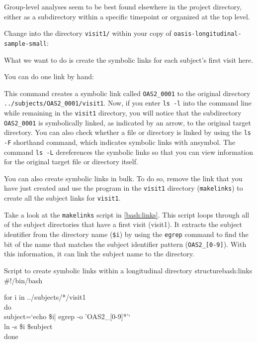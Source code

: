 Group-level analyses seem to be best found elsewhere in the project
directory, either as a subdirectory within a specific timepoint or organized at the top
level.

Change into the directory \texttt{visit1/} within your copy of \texttt{oasis-longitudinal-sample-small}:

What we want to do is create the symbolic links for each subject's first visit here. 

You can do one link by hand:

This command creates a symbolic link called \texttt{OAS2_0001} to the original directory \texttt{../subjects/OAS2_0001/visit1}. 
Now, if you enter \texttt{ls -l} into the command line while remaining in the \texttt{visit1} directory, you will notice that the subdirectory \texttt{OAS2_0001} is symbolically linked, as indicated by an arrow, to the original target directory. You can also check whether a file or directory is linked by using the \texttt{ls -F} shorthand command, which indicates symbolic links with an\@ symbol. The command \texttt{ls -L} dereferences the symbolic links so that you can view information for the original target file or directory itself.

You can also create symbolic links in bulk. To do so, remove the link that you have just created and
use the program in the \texttt{visit1} directory (\texttt{makelinks}) to create all the subject links for \texttt{visit1}. 

Take a look at the \texttt{makelinks} script in \autoref{bash:links}. This script loops through all of the subject directories that have a first visit (visit1). It extracts the subject identifier from the directory name (\texttt{\$i}) by using the \texttt{egrep} command to find the bit of the name that matches the subject identifier pattern (\texttt{OAS2_[0-9]}). With this information, it can link the subject name to the directory. 

\begin{bash}{Script to create symbolic links within a longitudinal
    directory structure}{bash:links}
\#!/bin/bash

for i in ../subjects/*/visit1\\
do\\
\tab	subject=`echo \$i| egrep -o 'OAS2_[0-9]*'` \\
\tab	ln -s \$i \$subject\\
done\\
\end{bash}

